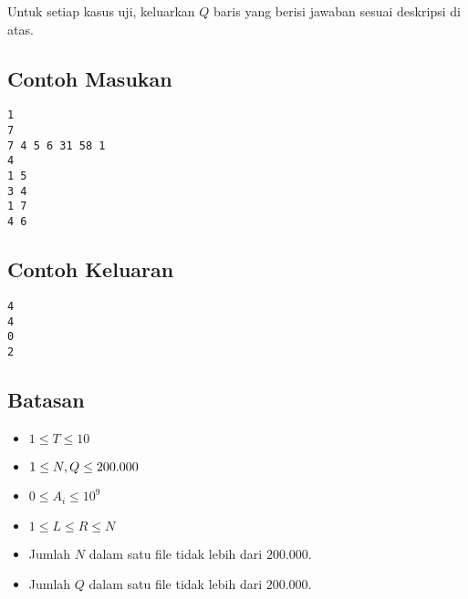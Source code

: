 \documentclass{article}
\begin{document}
\par Untuk setiap kasus uji, keluarkan $Q$ baris yang berisi jawaban sesuai deskripsi di atas. 

\subsection*{Contoh Masukan}

\begin{lstlisting}
1
7
7 4 5 6 31 58 1
4
1 5
3 4
1 7
4 6
\end{lstlisting}

\subsection*{Contoh Keluaran}

\begin{lstlisting}
4
4
0
2

\end{lstlisting}

\subsection*{Batasan}

\begin{itemize}
  \item $1 \leq T\leq 10$
  \item $1 \leq N,\space Q\leq 200.000$
    \item $0 \leq A_{i} \leq 10^9$
    \item $1 \leq L \leq R \leq N$
    \item Jumlah $N$ dalam satu file tidak lebih dari $200.000$.
    \item Jumlah $Q$ dalam satu file tidak lebih dari $200.000$.
\end{itemize}
\end{document}
